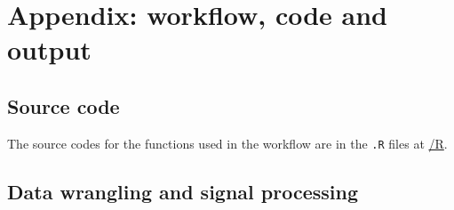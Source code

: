 \documentclass[
]{article}
\begin{document}
\newpage

\hypertarget{appendix-workflow-code-and-output}{%
\section{Appendix: workflow, code and
output}\label{appendix-workflow-code-and-output}}

\hypertarget{source-code}{%
\subsection{Source code}\label{source-code}}

The source codes for the functions used in the workflow are in the
\texttt{.R} files at
\href{https://github.com/szmsu2011/comp90072/blob/main/R}{/R}.

\hypertarget{data-wrangling-and-signal-processing}{%
\subsection{Data wrangling and signal
processing}\label{data-wrangling-and-signal-processing}}
\end{document}
